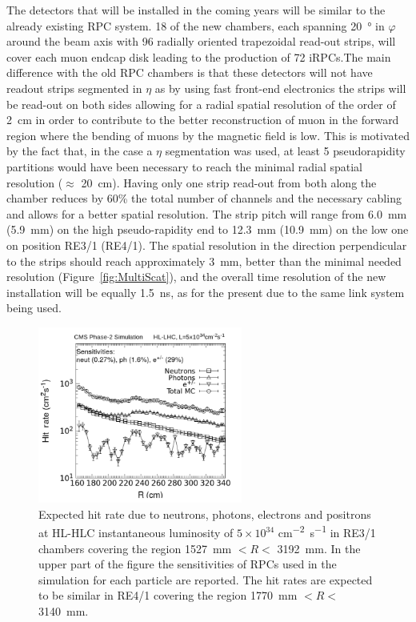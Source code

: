 	The detectors that will be installed in the coming years will be similar to the already existing RPC system. 18 of the new chambers, each spanning \SI{20}{\degree} in $\varphi$ around the beam axis with 96 radially oriented trapezoidal read-out strips, will cover each muon endcap disk leading to the production of 72 iRPCs.The main difference with the old RPC chambers is that these detectors will not have readout strips segmented in $\eta$ as by using fast front-end electronics the strips will be read-out on both sides allowing for a radial spatial resolution of the order of \SI{2}{cm} in order to contribute to the better reconstruction of muon in the forward region where the bending of muons by the magnetic field is low. This is motivated by the fact that, in the case a $\eta$ segmentation was used, at least 5 pseudorapidity partitions would have been necessary to reach the minimal radial spatial resolution ($\approx$ \SI{20}{cm}). Having only one strip read-out from both along the chamber reduces by 60\% the total number of channels and the necessary cabling and allows for a better spatial resolution. The strip pitch will range from \SI{6.0}{mm} (\SI{5.9}{mm}) on the high pseudo-rapidity end to \SI{12.3}{mm} (\SI{10.9}{mm}) on the low one on position RE3/1 (RE4/1). The spatial resolution in the direction perpendicular to the strips should reach approximately \SI{3}{mm}, better than the minimal needed resolution (Figure~\ref{fig:MultiScat}), and the overall time resolution of the new installation will be equally \SI{1.5}{ns}, as for the present due to the same link system being used.

	\begin{figure}[H]
		\centering
		\includegraphics[width=0.6\textwidth]{fig/chapt3/RPC-Sim-HL-LHC_Rate.png}
		\caption{\label{fig:iRPC-Rate} Expected hit rate due to neutrons, photons, electrons and positrons at HL-HLC instantaneous luminosity of $5\times10^{34}$ \si{cm^{-2}s^{-1}} in RE3/1 chambers covering the region \SI{1527}{mm} $<R<$ \SI{3192}{mm}. In the upper part of the figure the sensitivities of RPCs used in the simulation for each particle are reported. The hit rates are expected to be similar in RE4/1 covering the region \SI{1770}{mm} $<R<$ \SI{3140}{mm}.}
	\end{figure}
	
